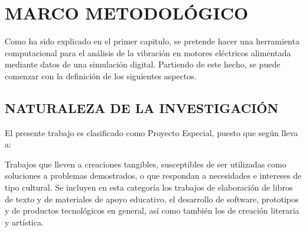 \thispagestyle{empty}

\section{MARCO METODOLÓGICO}

Como ha sido explicado en el primer capitulo, se pretende hacer una herramienta
computacional para el análisis de la vibración en motores eléctricos alimentada
mediante datos de una simulación digital. Partiendo de este hecho, se puede
comenzar con la definición de los siguientes aspectos.

\subsection{NATURALEZA DE LA INVESTIGACIÓN}

El presente trabajo es clasificado como Proyecto Especial, puesto que según
\textcite{Hernandez} lleva a:

\begin{center}
    \parbox[ht]{13.5 cm}{Trabajos que lleven a creaciones tangibles,
    susceptibles de ser utilizadas como soluciones a problemas demostrados, o
    que respondan a necesidades e intereses de tipo cultural. Se incluyen en
    esta categoría los trabajos de elaboración de libros de texto y de
    materiales de apoyo educativo, el desarrollo de software, prototipos y de
    productos tecnológicos en general, así como también los de creación
    literaria y artística.}
\end{center}
